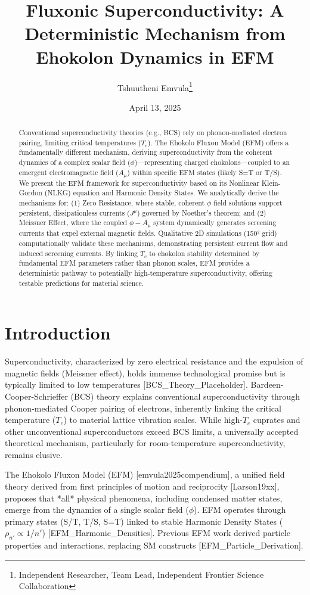\documentclass[11pt]{article}
\title{Fluxonic Superconductivity: A Deterministic Mechanism from Ehokolon Dynamics in EFM} %
\author{Tshuutheni Emvula\thanks{Independent Researcher, Team Lead, Independent Frontier Science Collaboration}}
\date{April 13, 2025} %
\newcommand{\citepaper}[1]{[#1]} %
\begin{document}
\maketitle

\begin{abstract}
Conventional superconductivity theories (e.g., BCS) rely on phonon-mediated electron pairing, limiting critical temperatures (\(T_c\)). The Ehokolo Fluxon Model (EFM) offers a fundamentally different mechanism, deriving superconductivity from the coherent dynamics of a complex scalar field (\(\phi\))—representing charged ehokolons—coupled to an emergent electromagnetic field (\(A_\mu\)) within specific EFM states (likely S=T or T/S). We present the EFM framework for superconductivity based on its Nonlinear Klein-Gordon (NLKG) equation and Harmonic Density States. We analytically derive the mechanisms for: (1) Zero Resistance, where stable, coherent \(\phi\) field solutions support persistent, dissipationless currents (\(J^\mu\)) governed by Noether's theorem; and (2) Meissner Effect, where the coupled \(\phi-A_\mu\) system dynamically generates screening currents that expel external magnetic fields. Qualitative 2D simulations (150² grid) computationally validate these mechanisms, demonstrating persistent current flow and induced screening currents. By linking \(T_c\) to ehokolon stability determined by fundamental EFM parameters rather than phonon scales, EFM provides a deterministic pathway to potentially high-temperature superconductivity, offering testable predictions for material science.
\end{abstract}

\section{Introduction}
Superconductivity, characterized by zero electrical resistance and the expulsion of magnetic fields (Meissner effect), holds immense technological promise but is typically limited to low temperatures \citepaper{BCS_Theory_Placeholder}. Bardeen-Cooper-Schrieffer (BCS) theory explains conventional superconductivity through phonon-mediated Cooper pairing of electrons, inherently linking the critical temperature (\(T_c\)) to material lattice vibration scales. While high-\(T_c\) cuprates and other unconventional superconductors exceed BCS limits, a universally accepted theoretical mechanism, particularly for room-temperature superconductivity, remains elusive.

The Ehokolo Fluxon Model (EFM) \citepaper{emvula2025compendium}, a unified field theory derived from first principles of motion and reciprocity [Larson19xx], proposes that *all* physical phenomena, including condensed matter states, emerge from the dynamics of a single scalar field (\(\phi\)). EFM operates through primary states (S/T, T/S, S=T) linked to stable Harmonic Density States (\(\rho_{n'} \propto 1/n'\)) \citepaper{EFM_Harmonic_Densities}. Previous EFM work derived particle properties and interactions, replacing SM constructs \citepaper{EFM_Particle_Derivation}.
\end{document}
